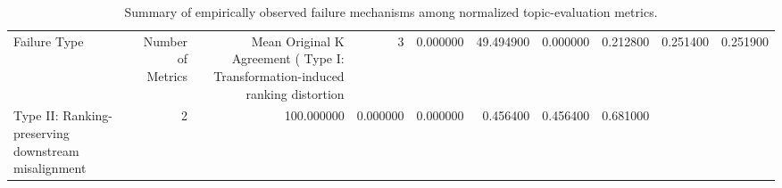 \begin{table}
\caption{Summary of empirically observed failure mechanisms among normalized topic-evaluation metrics.}
\label{tab:failure_type_summary}
\begin{tabular}{lrrrrrrr}
\toprule
Failure Type & Number of Metrics & Mean Original K Agreement (%
\midrule
Type I: Transformation-induced ranking distortion & 3 & 0.000000 & 49.494900 & 0.000000 & 0.212800 & 0.251400 & 0.251900 \\
Type II: Ranking-preserving downstream misalignment & 2 & 100.000000 & 0.000000 & 0.000000 & 0.456400 & 0.456400 & 0.681000 \\
\bottomrule
\end{tabular}
\end{table}
